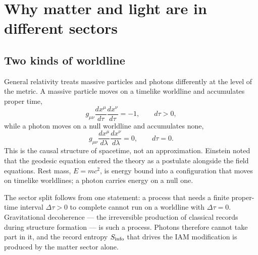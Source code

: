 \chapter{Why matter and light are in different sectors}\label{ch:dsnote}

\section{Two kinds of worldline}
General relativity treats massive particles and photons differently at the level of the metric. A massive particle moves on a timelike worldline and accumulates
proper time,
\begin{equation}
g_{\mu\nu}\frac{dx^\mu}{d\tau}\frac{dx^\nu}{d\tau}=-1,\qquad d\tau>0,
\end{equation}
while a photon moves on a null worldline and accumulates none,
\begin{equation}
g_{\mu\nu}\frac{dx^\mu}{d\lambda}\frac{dx^\nu}{d\lambda}=0,\qquad d\tau=0 .
\end{equation}
This is the causal structure of spacetime, not an approximation. Einstein noted that the geodesic equation entered the theory as a postulate alongside the field
equations. Rest mass, $E=mc^2$, is energy bound into a configuration that moves on timelike worldlines; a photon carries energy on a null one.

The sector split follows from one statement: a process that needs a finite proper-time interval $\Delta\tau>0$ to complete cannot run on a worldline with
$\Delta\tau=0$. Gravitational decoherence --- the irreversible production of classical records during structure formation --- is such a process. Photons
therefore cannot take part in it, and the record entropy $S_{\rm info}$ that drives the IAM modification is produced by the matter sector alone.

